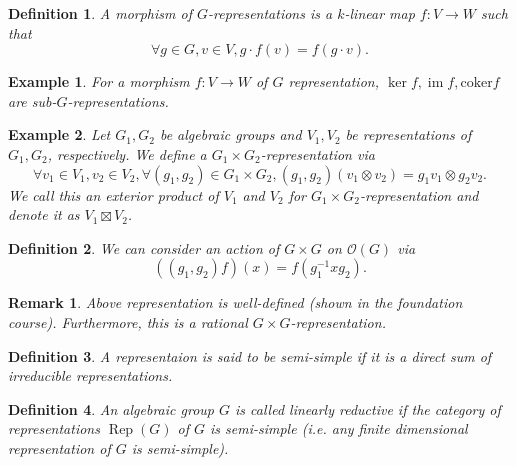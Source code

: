 \documentclass[10pt]{article}
\newtheorem{definition}{Definition}[section]
\newtheorem{remark}{Remark}[section]
\newtheorem{example}{Example}[section]
\numberwithin{equation}{theorem}
\DeclareMathOperator{\Rep}{Rep}
\DeclareMathOperator{\Ker}{ker}
\DeclareMathOperator{\Image}{im}
\newcommand{\Ouv}[0]{\mathcal{O}}
\begin{document}
\begin{definition}
  A morphism of $G$-representations is a $k$-linear map $f:V\to W$ such that 
  \begin{equation*}
    \forall g\in G,v\in V, g\cdot f(v) = f(g\cdot v).
  \end{equation*}
\end{definition}
\begin{example}
  For a morphism $f:V\to W$ of $G$ representation, $\Ker f,\Image f, \mathrm{coker} f$ are sub-$G$-representations.
\end{example}
\begin{example}
  Let $G_1,G_2$ be algebraic groups and $V_1,V_2$ be representations of $G_1,G_2$, respectively. We define a $G_1\times G_2$-representation via
  \begin{equation*}
    \forall v_1\in V_1,v_2\in V_2,\forall (g_1,g_2)\in G_1\times G_2, (g_1,g_2)(v_1\otimes v_2) = g_1v_1\otimes g_2v_2.
  \end{equation*}
  We call this an exterior product of $V_1$ and $V_2$ for $G_1\times G_2$-representation and denote it as $V_1\boxtimes V_2$.
\end{example}
\begin{definition}
  We can consider an action of $G\times G$ on $\Ouv(G)$ via 
  \begin{equation*}
    ((g_1,g_2)f)(x) = f(g_1^{-1}xg_2).
  \end{equation*}
\end{definition}

\begin{remark}
  Above representation is well-defined (shown in the foundation course). Furthermore, this is a rational $G\times G$-representation.
\end{remark}

\begin{definition}
A representaion is said to be semi-simple if it is a direct sum of irreducible representations.
\end{definition}

\begin{definition}
An algebraic group $G$ is called linearly reductive if the category of representations $\Rep(G)$ of $G$ is semi-simple (i.e. any finite dimensional representation of $G$ is semi-simple).
\end{definition}
\end{document}
